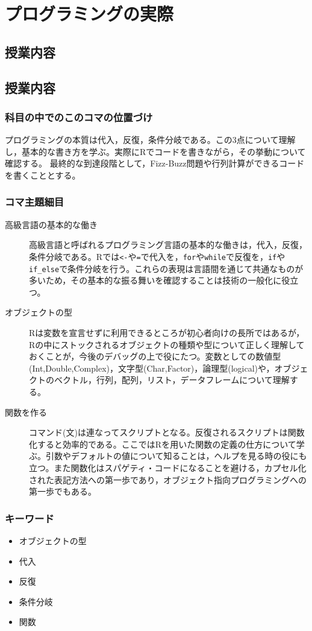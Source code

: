 \section{プログラミングの実際}
\subsection{授業内容}
\subsection{授業内容}
\subsubsection{科目の中でのこのコマの位置づけ}

プログラミングの本質は代入，反復，条件分岐である。この3点について理解し，基本的な書き方を学ぶ。実際にRでコードを書きながら，その挙動について確認する。
最終的な到達段階として，Fizz-Buzz問題や行列計算ができるコードを書くこととする。

\subsubsection{コマ主題細目}
\begin{description}
	\item[高級言語の基本的な働き]高級言語と呼ばれるプログラミング言語の基本的な働きは，代入，反復，条件分岐である。Rでは\verb|<-|や\verb|=|で代入を，\verb|for|や\verb|while|で反復を，\verb|if|や\verb|if_else|で条件分岐を行う。これらの表現は言語間を通じて共通なものが多いため，その基本的な振る舞いを確認することは技術の一般化に役立つ。
	\item[オブジェクトの型] Rは変数を宣言せずに利用できるところが初心者向けの長所ではあるが，Rの中にストックされるオブジェクトの種類や型について正しく理解しておくことが，今後のデバッグの上で役にたつ。変数としての数値型(Int,Double,Complex)，文字型(Char,Factor)，論理型(logical)や，オブジェクトのベクトル，行列，配列，リスト，データフレームについて理解する。
	\item[関数を作る] コマンド(文)は連なってスクリプトとなる。反復されるスクリプトは関数化すると効率的である。ここではRを用いた関数の定義の仕方について学ぶ。引数やデフォルトの値について知ることは，ヘルプを見る時の役にも立つ。また関数化はスパゲティ・コードになることを避ける，カプセル化された表記方法への第一歩であり，オブジェクト指向プログラミングへの第一歩でもある。
\end{description}
\subsubsection{キーワード}
\begin{itemize}
	\item オブジェクトの型
	\item 代入
	\item 反復
	\item 条件分岐
	\item 関数
\end{itemize}
